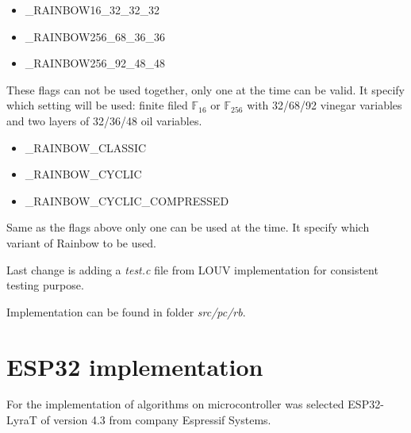 \documentclass[thesis=M,english]{FITthesis}[2019/12/23]
\begin{document}
\begin{itemize}
\item	\_RAINBOW16\_32\_32\_32 
\item	\_RAINBOW256\_68\_36\_36 
\item	\_RAINBOW256\_92\_48\_48 
\end{itemize}
These flags can not be used together, only one at the time can be valid. It specify which setting will be used: finite filed $\mathbb{F}_{16}$ or $\mathbb{F}_{256}$ with 32/68/92 vinegar variables and two layers of 32/36/48 oil variables.

\begin{itemize}
\item	\_RAINBOW\_CLASSIC  
\item	\_RAINBOW\_CYCLIC 
\item	\_RAINBOW\_CYCLIC\_COMPRESSED 
\end{itemize}
Same as the flags above only one can be used at the time. It specify which variant of Rainbow to be used.

\bigskip
\noindent
Last change is adding a \textit{test.c} file from LOUV implementation for consistent testing purpose.

\bigskip
\noindent
Implementation can be found in folder \textit{src/pc/rb}.  

\section{ESP32 implementation}
For the implementation of algorithms on microcontroller was selected ESP32-LyraT of version 4.3 from company Espressif Systems.
\end{document}
